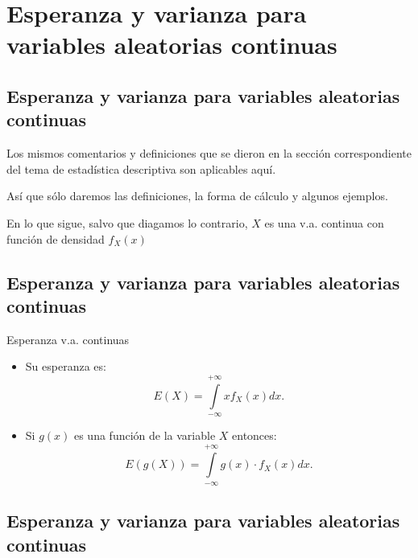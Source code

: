 \documentclass[]{book}
\providecommand{\tightlist}{%
  \setlength{\itemsep}{0pt}\setlength{\parskip}{0pt}}
\begin{document}
\hypertarget{esperanza-y-varianza-para-variables-aleatorias-continuas}{%
\section{Esperanza y varianza para variables aleatorias continuas}\label{esperanza-y-varianza-para-variables-aleatorias-continuas}}

\hypertarget{esperanza-y-varianza-para-variables-aleatorias-continuas-1}{%
\subsection{Esperanza y varianza para variables aleatorias continuas}\label{esperanza-y-varianza-para-variables-aleatorias-continuas-1}}

Los mismos comentarios y definiciones que se dieron en la sección correspondiente del tema
de estadística descriptiva son aplicables aquí.

Así que sólo daremos las definiciones, la forma de cálculo y algunos ejemplos.

En lo que sigue, salvo que diagamos lo contrario, \(X\) es una v.a. continua con función de densidad \(f_{X}(x)\)

\hypertarget{esperanza-y-varianza-para-variables-aleatorias-continuas-2}{%
\subsection{Esperanza y varianza para variables aleatorias continuas}\label{esperanza-y-varianza-para-variables-aleatorias-continuas-2}}

 Esperanza v.a. continuas

\begin{itemize}
\tightlist
\item
  Su esperanza es:
  \[E(X)=\displaystyle\int\limits_{-\infty}^{+\infty} xf_{X}(x)dx.\]
\item
  Si \(g(x)\) es una función de la variable \(X\) entonces:
  \[E(g(X))=\displaystyle\int\limits_{-\infty}^{+\infty} g(x)\cdot f_{X}(x)dx.\]
\end{itemize}

\hypertarget{esperanza-y-varianza-para-variables-aleatorias-continuas-3}{%
\subsection{Esperanza y varianza para variables aleatorias continuas}\label{esperanza-y-varianza-para-variables-aleatorias-continuas-3}}
\end{document}
